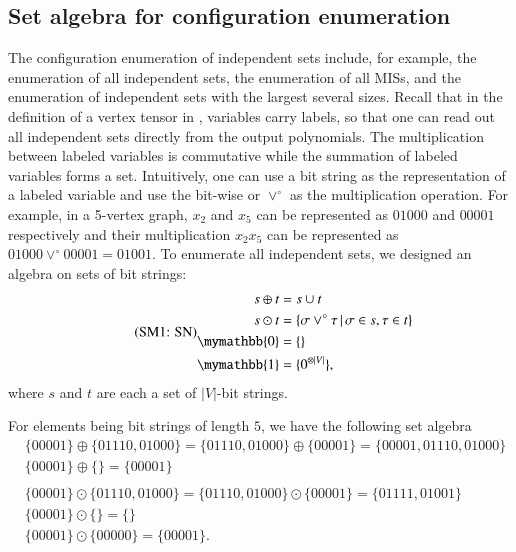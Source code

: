 \documentclass[review, onefignum, onetabnum]{siamart190516}
\begin{document}
\subsection{Set algebra for configuration enumeration}

The configuration enumeration of independent sets include, for example, the enumeration of all independent sets, the enumeration of all MISs, and the enumeration of independent sets with the largest several sizes.
Recall that in the definition of a vertex tensor in , variables carry labels, so that one can read out all independent sets directly from the output polynomials.
The multiplication between labeled variables is commutative while the summation of labeled variables forms a set.
Intuitively, one can use a bit string as the representation of a labeled variable and use the bit-wise or $\lor^\circ$ as the multiplication operation.
For example, in a 5-vertex graph, $x_2$ and $x_5$ can be represented as $01000$ and $00001$ respectively and their multiplication $x_2x_5$ can be represented as $01000 \lor^\circ 00001 = 01001$.
To enumerate all independent sets, we designed an algebra on sets of bit strings:
\begin{equation}
\eqname{SN}
\begin{split}
    s \oplus t &= s \cup t\\
    s \odot t &= \{\sigma \lor^\circ \tau \, | \, \sigma \in s, \tau \in t\}\\
    \mymathbb{0} &= \{\}\\
    \mymathbb{1} &= \{0^{\otimes |V|}\},
\end{split}\label{eq:set}
\end{equation}
where $s$ and $t$ are each a set of $|V|$-bit strings.
\begin{example}\label{eg:setalgebra}
    For elements being bit strings of length $5$, we have the following set algebra
\begin{equation*}
\begin{split}
    &\{00001\} \oplus \{01110, 01000\} = \{01110, 01000\} \oplus \{00001\} = \{00001,01110, 01000\}\\
    &\{00001\} \oplus \{\} = \{00001\}\\
&\\
    &\{00001\} \odot \{01110, 01000\} = \{01110, 01000\} \odot \{00001\} = \{01111, 01001\}\\
    &\{00001\} \odot \{\} = \{\}\\
    &\{00001\} \odot \{00000\} = \{00001\}.
\end{split}
\end{equation*}
\end{example}
\end{document}
